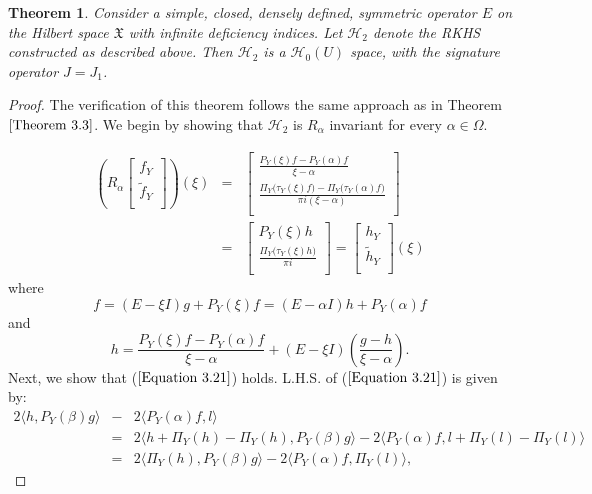 \documentclass [12pt,reqno]{amsart}
\numberwithin{equation}{subsection}
\newtheorem{thm}{Theorem}[section]
\numberwithin{equation}{section}
\begin{document}
\begin{thm}\label{Theorem 3.7}
Consider a simple, closed, densely defined, symmetric operator $E$ on the Hilbert space $\mathfrak{X}$ with infinite deficiency indices. Let $\mathcal{H}_2$ denote the RKHS constructed as described above. Then $\mathcal{H}_2$ is a $\mathcal{H}_0(U)$ space, with the signature operator $J = J_1$.
\end{thm}
\begin{proof}
The verification of this theorem follows the same approach as in Theorem $\ref{Theorem 3.3}$. We begin by showing that $\mathcal{H}_2$ is $R_\alpha$ invariant for every $\alpha \in \Omega$.

\begin{eqnarray*}
\left(R_{\alpha} \begin{bmatrix} 
	f_Y  \\
	\tilde{f}_Y \\
	\end{bmatrix}\right) (\xi)\nonumber	
&=&  \begin{bmatrix}
	\frac{P_Y(\xi)f-P_Y(\alpha)f}{\xi-\alpha}  \\
	\frac{\Pi_{Y} \bigl(\tau_Y(\xi)f \bigl)- \Pi_{Y} \bigl(\tau_Y(\alpha)f \bigl)}{\pi i(\xi-\alpha)}\\
	\end{bmatrix}\\
&=&	\begin{bmatrix} 
	P_Y(\xi)h  \\
	\frac{\Pi_{Y} \bigl(\tau_Y(\xi)h \big)}{\pi i} \\
	\end{bmatrix} 
=\begin{bmatrix} 
	h_Y  \\
	\tilde{h}_Y\\
	\end{bmatrix} (\xi)
\end{eqnarray*}
where$$
f
=(E-\xi I)g+P_Y(\xi)f
=(E-\alpha I)h+P_Y(\alpha)f$$
and $$ h=\frac{P_Y(\xi)f - P_Y(\alpha)f}{\xi-\alpha}+(E-\xi I)\left( \frac{g-h}{\xi-\alpha}\right).$$
Next, we show that ($\ref{Equation 3.21}$) holds. L.H.S. of ($\ref{Equation 3.21}$) is given by: 
\begin{eqnarray*}
     2\langle h,P_Y(\beta)g \rangle &-& 2 \langle P_Y(\alpha)f,l \rangle \\
&=&   2\langle h + \Pi_{Y}(h) -\Pi_{Y}(h),P_Y(\beta)g \rangle - 2 \langle P_Y(\alpha)f,l + \Pi_{Y}(l) -\Pi_{Y}(l) \rangle \\
&=&      2\langle \Pi_{Y}(h) , P_Y(\beta)g \rangle - 2 \langle P_Y(\alpha)f,\Pi_{Y}(l) \rangle,

\end{eqnarray*}
\end{proof}
\end{document}
